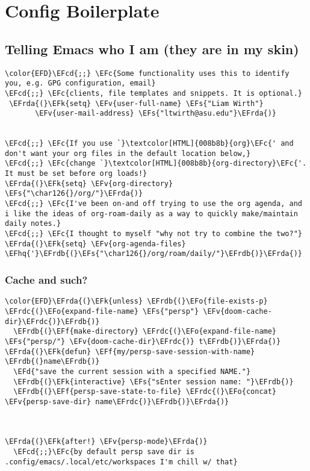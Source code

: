 \documentclass{article}
\newcommand{\EFc}[1]{\textcolor{EFc}{#1}} %
\newcommand{\EFcd}[1]{\textcolor{EFcd}{#1}} %
\newcommand{\EFs}[1]{\textcolor{EFs}{#1}} %
\newcommand{\EFd}[1]{\textcolor{EFd}{#1}} %
\newcommand{\EFk}[1]{\textcolor{EFk}{#1}} %
\newcommand{\EFf}[1]{\textcolor{EFf}{#1}} %
\newcommand{\EFv}[1]{\textcolor{EFv}{#1}} %
\newcommand{\EFo}[1]{\textcolor{EFo}{#1}} %
\newcommand{\EFhq}[1]{#1} %
\newcommand{\EFrda}[1]{\textcolor{EFrda}{#1}} %
\newcommand{\EFrdb}[1]{\textcolor{EFrdb}{#1}} %
\newcommand{\EFrdc}[1]{\textcolor{EFrdc}{#1}} %
\begin{document}
\section{Config Boilerplate}
\label{sec:org1a02a47}
\subsection{Telling Emacs who I am (they are in my skin)}
\label{sec:orga456cea}
\begin{Code}
\begin{Verbatim}
\color{EFD}\EFcd{;;} \EFc{Some functionality uses this to identify you, e.g. GPG configuration, email}
\EFcd{;;} \EFc{clients, file templates and snippets. It is optional.}
 \EFrda{(}\EFk{setq} \EFv{user-full-name} \EFs{"Liam Wirth"}
       \EFv{user-mail-address} \EFs{"ltwirth@asu.edu"}\EFrda{)}


\EFcd{;;} \EFc{If you use `}\textcolor[HTML]{008b8b}{org}\EFc{' and don't want your org files in the default location below,}
\EFcd{;;} \EFc{change `}\textcolor[HTML]{008b8b}{org-directory}\EFc{'. It must be set before org loads!}
\EFrda{(}\EFk{setq} \EFv{org-directory} \EFs{"\char126{}/org/"}\EFrda{)}
\EFcd{;;} \EFc{I've been on-and off trying to use the org agenda, and i like the ideas of org-roam-daily as a way to quickly make/maintain daily notes.}
\EFcd{;;} \EFc{I thought to myself "why not try to combine the two?"}
\EFrda{(}\EFk{setq} \EFv{org-agenda-files} \EFhq{'}\EFrdb{(}\EFs{"\char126{}/org/roam/daily/"}\EFrdb{)}\EFrda{)}
\end{Verbatim}
\end{Code}

\subsubsection{Cache and such?}
\label{sec:org32953d9}
\begin{Code}
\begin{Verbatim}
\color{EFD}\EFrda{(}\EFk{unless} \EFrdb{(}\EFo{file-exists-p} \EFrdc{(}\EFo{expand-file-name} \EFs{"persp"} \EFv{doom-cache-dir}\EFrdc{)}\EFrdb{)}
  \EFrdb{(}\EFf{make-directory} \EFrdc{(}\EFo{expand-file-name} \EFs{"persp/"} \EFv{doom-cache-dir}\EFrdc{)} t\EFrdb{)}\EFrda{)}
\EFrda{(}\EFk{defun} \EFf{my/persp-save-session-with-name} \EFrdb{(}name\EFrdb{)}
  \EFd{"save the current session with a specified NAME."}
  \EFrdb{(}\EFk{interactive} \EFs{"sEnter session name: "}\EFrdb{)}
  \EFrdb{(}\EFf{persp-save-state-to-file} \EFrdc{(}\EFo{concat} \EFv{persp-save-dir} name\EFrdc{)}\EFrdb{)}\EFrda{)}



\EFrda{(}\EFk{after!} \EFv{persp-mode}\EFrda{)}
  \EFcd{;;}\EFc{by default persp save dir is .config/emacs/.local/etc/workspaces I'm chill w/ that}


\end{Verbatim}
\end{Code}
\end{document}
